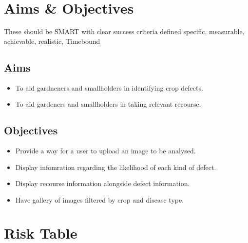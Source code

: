 \section{Aims \& Objectives}
  These should be SMART with clear success criteria defined
  specific, measurable, achievable, realistic, Timebound
  \subsection{Aims}
    \begin{itemize}
      \item To aid gardneners and smallholders in identifying crop defects.
      \item To aid gardeners and smallholders in taking relevant recourse.
    \end{itemize}
  \subsection{Objectives}
    \begin{itemize}
      \item Provide a way for a user to upload an image to be analysed.
      \item Display infomration regarding the likelihood of each kind of defect.
      \item Display recourse information alongside defect information.
      \item Have gallery of images filtered by crop and disease type.
    \end{itemize}

\section{Risk Table}


